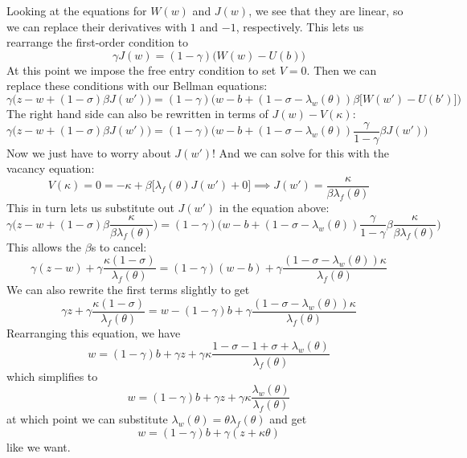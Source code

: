 \documentclass[12pt, letterpaper, parskip = full]{article}
\begin{document}
	Looking at the equations for \(W(w)\) and \(J(w)\), we see that they are linear, so we can replace their derivatives with \(1\) and \(-1\), respectively. This lets us rearrange the first-order condition to
	\[ \gamma J(w) = (1 - \gamma)\Big(W(w) - U(b)\Big)   \]
	At this point we impose the free entry condition to set \(V = 0\). Then we can replace these conditions with our Bellman equations:
	\[ \gamma \Bigg( z - w + (1 - \sigma) \beta J(w')\Bigg) = (1 - \gamma) \Bigg( w - b + (1 - \sigma - \lambda_w(\theta)) \beta \Big[   W(w') - U(b')\Big]  \Bigg)    \]
	The right hand side can also be rewritten in terms of \(J(w) - V(\kappa)\):
	\[ \gamma \Bigg( z - w + (1 - \sigma) \beta J(w') \Bigg) = (1 - \gamma) \Bigg( w - b + (1 - \sigma - \lambda_w(\theta)) \frac{\gamma}{1 - \gamma}\beta J(w')  \Bigg)    \]
	Now we just have to worry about \(J(w')\)! And we can solve for this with the vacancy equation:
	\[ V(\kappa) = 0 = -\kappa + \beta \Big[ \lambda_f(\theta) J(w') + 0 \Big] \implies J(w') = \frac{\kappa}{\beta \lambda_f(\theta)}  \]
	This in turn lets us substitute out \(J(w')\) in the equation above:
	\[ \gamma \Bigg(z - w + (1 - \sigma) \beta \frac{\kappa}{\beta \lambda_f(\theta)}\Bigg) = (1 - \gamma)\Bigg(w - b + (1 - \sigma - \lambda_w(\theta)) \frac{\gamma}{1 - \gamma} \beta \frac{\kappa}{\beta \lambda_f(\theta)}\Bigg)     \]
	This allows the \(\beta\)s to cancel:
	\[ \gamma (z - w) + \gamma \frac{\kappa (1 - \sigma)}{\lambda_f(\theta)} = (1 - \gamma)(w - b) + \gamma \frac{(1 - \sigma - \lambda_w(\theta)) \kappa}{\lambda_f(\theta)}   \]
	We can also rewrite the first terms slightly to get
	\[ \gamma z + \gamma \frac{\kappa (1 - \sigma)}{\lambda_f(\theta)} = w - (1 - \gamma) b + \gamma \frac{(1 - \sigma - \lambda_w(\theta)) \kappa}{\lambda_f(\theta)}    \]
	Rearranging this equation, we have
	\[ w = (1 - \gamma) b + \gamma z + \gamma \kappa \frac{1 - \sigma - 1 + \sigma + \lambda_w(\theta)}{\lambda_f(\theta)}  \]
	which simplifies to
	\[ w = (1 - \gamma) b + \gamma z + \gamma \kappa \frac{\lambda_w(\theta) }{\lambda_f(\theta)}    \]
	at which point we can substitute \(\lambda_w(\theta) = \theta \lambda_f(\theta)\) and get
	\[ w = (1 - \gamma) b + \gamma (z + \kappa \theta)  \]
	like we want. 
	
\end{document}
